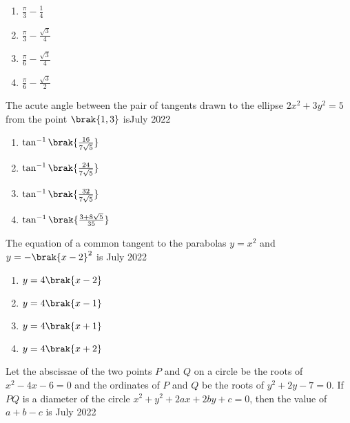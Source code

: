         \begin{multicols}{4}
        \begin{enumerate}
        \item $\frac{\pi}{3} - \frac{1}{4}$
        \item $\frac{\pi}{3} - \frac{\sqrt{3}}{4}$
        \item $\frac{\pi}{6} - \frac{\sqrt{3}}{4}$
        \item $\frac{\pi}{6} - \frac{\sqrt{3}}{2}$
        \end{enumerate}
        \end{multicols}
                        
    \item The acute angle between the pair of tangents drawn to the ellipse $2x^{2} + 3y^{2} = 5$ from the point $\brak{1, 3}$ is\hfill{July 2022}

        \begin{multicols}{4}
        \begin{enumerate}
        \item $\tan^{-1} \brak{\frac{16}{7\sqrt{5}}}$
        \item $\tan^{-1} \brak{\frac{24}{7\sqrt{5}}}$
        \item $\tan^{-1} \brak{\frac{32}{7\sqrt{5}}}$
        \item $\tan^{-1} \brak{\frac{3 + 8\sqrt{5}}{35}}$
        \end{enumerate}
        \end{multicols}

    \item The equation of a common tangent to the parabolas $y = x^{2}$ and $y = -\brak{x - 2}^{2}$ is \hfill{July 2022}

        \begin{multicols}{4}
        \begin{enumerate}
        \item $y = 4 \brak{x - 2}$
        \item $y = 4 \brak{x - 1}$
        \item $y = 4 \brak{x + 1}$
        \item $y = 4 \brak{x + 2}$
        \end{enumerate}
        \end{multicols}
        
    \item Let the abscissae of the two points $P$ and $Q$ on a circle be the roots of $x^{2} - 4x - 6 = 0$ and the ordinates of $P$ and $Q$ be the roots of $y^{2} + 2y - 7 = 0$. If $PQ$ is a diameter of the circle $x^{2} + y^{2} + 2ax + 2by + c = 0$, then the value of $a + b - c$ is \hfill{July 2022}

